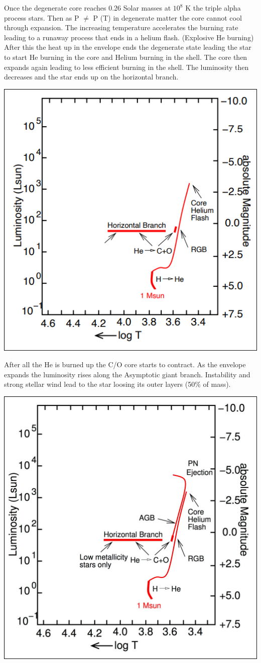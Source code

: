 \documentclass[11pt,a4paper]{article}
\begin{document}
Once the degenerate core reaches 0.26 Solar masses at $10^8$ K the triple alpha process stars. 
Then as P $\neq$ P (T) in degenerate matter the core cannot cool through expansion. 
The increasing temperature accelerates the burning rate leading to a runaway process that ends in a helium flash. (Explosive He burning)
After this the heat up in the envelope ends the degenerate state leading the star to start He burning in the core and Helium burning in the shell. 
The core then expands again leading to less efficient burning in the shell. 
The luminosity then decreases and the star ends up on the horizontal branch. 
\begin{center}
    \includegraphics[width=0.5\linewidth]{screenshot_2024-01-23-125357.png}
\end{center}
After all the He is burned up the C/O core starts to contract. 
As the envelope expands the luminosity rises along the Asymptotic giant branch. 
Instability and strong stellar wind lead to the star loosing its outer layers (50\% of mass). 
\begin{center}
    \includegraphics[width=0.5\linewidth]{screenshot_2024-01-23-125721.png}
\end{center}
\end{document}
